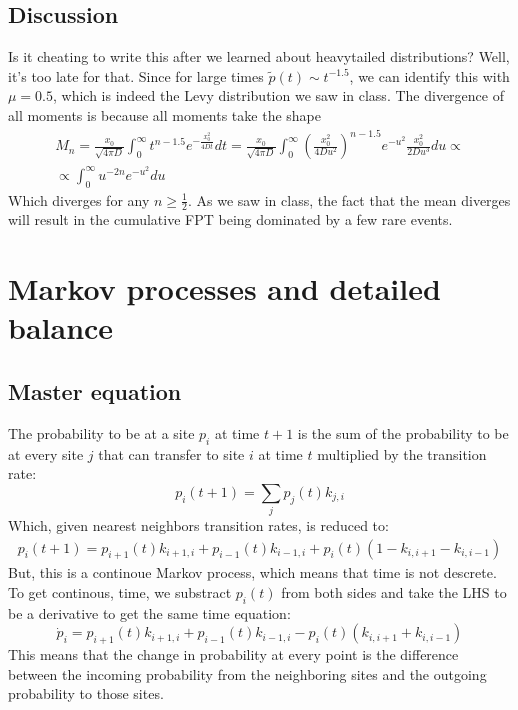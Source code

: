 \documentclass{article}
\begin{document}
\subsection{Discussion}
Is it cheating to write this after we learned about heavytailed distributions? Well, it's too late for that.
\newline
Since for large times $\tilde{p}(t) \sim t^{-1.5}$, we can identify this with $\mu = 0.5$, which is indeed the Levy distribution we saw in class. The divergence of all moments is because all moments take the shape
\begin{equation}
\begin{gathered}
    M_n = \frac{x_0}{\sqrt{4\pi D}} \int_0^\infty t^{n - 1.5}  e^{-\frac{x_0^2}{4Dt}} dt = \frac{x_0}{\sqrt{4\pi D}} \int_0^\infty \left(\frac{x_0^2}{4Du^2}\right)^{n - 1.5}  e^{-u^2} \frac{x_0^2}{2Du^3}du \propto \\ \propto
    \int_0^\infty u^{-2n} e^{-u^2} du
\end{gathered}
\end{equation}
Which diverges for any $n \ge \frac{1}{2}$.
\newline
As we saw in class, the fact that the mean diverges will result in the cumulative FPT being dominated by a few rare events.

\newpage
\section{Markov processes and detailed balance}
\subsection{Master equation}
The probability to be at a site $p_i$ at time $t + 1$ is the sum of the probability to be at every site $j$ that can transfer to site $i$ at time $t$ multiplied by the transition rate:
\begin{equation}
    p_i(t + 1) = \sum_j p_j(t) k_{j,i}
\end{equation}
Which, given nearest neighbors transition rates, is reduced to:
\begin{eqnarray}
    p_i(t + 1) = p_{i + 1}(t)k_{i + 1,i} + p_{i - 1}(t)k_{i - 1,i} + p_i(t)(1 - k_{i,i + 1} - k_{i,i - 1})
\end{eqnarray}
But, this is a continoue Markov process, which means that time is not descrete. To get continous, time, we substract $p_i(t)$ from both sides and take the LHS to be a derivative to get the same time equation:
\begin{equation}
    \boxed{\dot{p}_i = p_{i + 1}(t)k_{i + 1,i} + p_{i - 1}(t)k_{i - 1,i} - p_i(t)(k_{i,i + 1} + k_{i,i - 1})}
\end{equation}
This means that the change in probability at every point is the difference between the incoming probability from the neighboring sites and the outgoing probability to those sites.
\end{document}
